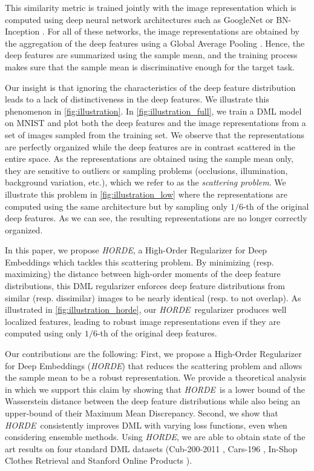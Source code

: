 \documentclass[10pt,twocolumn,letterpaper]{article}
\def\ourmethod{\textit{HORDE}}
\begin{document}
    This similarity metric is trained jointly with the image representation which is computed using deep neural network architectures such as GoogleNet \cite{Szegedy_2015_CVPR} or BN-Inception \cite{Ioffe_2015_ICML}.
    For all of these networks, the image representations are obtained by the aggregation of the deep features using a Global Average Pooling \cite{Zhou_2016_CVPR}.
    Hence, the deep features are summarized using the sample mean, and the training process makes sure that the sample mean is discriminative enough for the target task.
    


    Our insight is that ignoring the characteristics of the deep feature distribution leads to a lack of distinctiveness in the deep features.
    We illustrate this phenomenon in \autoref{fig:illustration}.
    In \autoref{fig:illustration_full}, we train a DML model on MNIST and plot both the deep features and the image representations from a set of images sampled from the training set.
    We observe that the representations are perfectly organized while the deep features are in contrast scattered in the entire space.
    As the representations are obtained using the sample mean only, they are sensitive to outliers or sampling problems (occlusions, illumination, background variation, etc.), which we refer to as the \emph{scattering problem}.
    We illustrate this problem in \autoref{fig:illustration_low} where the representations are computed using the same architecture but by sampling only $1/6$-th of the original deep features.
    As we can see, the resulting representations are no longer correctly organized.
    
    In this paper, we propose \ourmethod, a High-Order Regularizer for Deep Embeddings which tackles this scattering problem.
    By minimizing (resp. maximizing) the distance between high-order moments of the deep feature distributions, this DML regularizer enforces deep feature distributions from similar (resp. dissimilar) images to be nearly identical (resp. to not overlap).
    As illustrated in \autoref{fig:illustration_horde}, our \ourmethod \ regularizer produces well localized features, leading to robust image representations even if they are computed using only $1/6$-th of the original deep features.
    
    Our contributions are the following: First, we propose a High-Order Regularizer for Deep Embeddings (\ourmethod) that reduces the scattering problem and allows the sample mean to be a robust representation.
    We provide a theoretical analysis in which we support this claim by showing that \ourmethod \ is a lower bound of the Wasserstein distance between the deep feature distributions while also being an upper-bound of their Maximum Mean Discrepancy.
    Second, we show that \ourmethod \ consistently improves DML with varying loss functions, even when considering ensemble methods. Using \ourmethod, we are able to obtain state of the art results on four standard DML datasets (Cub-200-2011 \cite{CUB_200_2011}, Cars-196 \cite{CARS_196}, In-Shop Clothes Retrieval \cite{Liu_2016_CVPR_INSHOP} and Stanford Online Products \cite{Song_2016_CVPR}).
    
\end{document}
